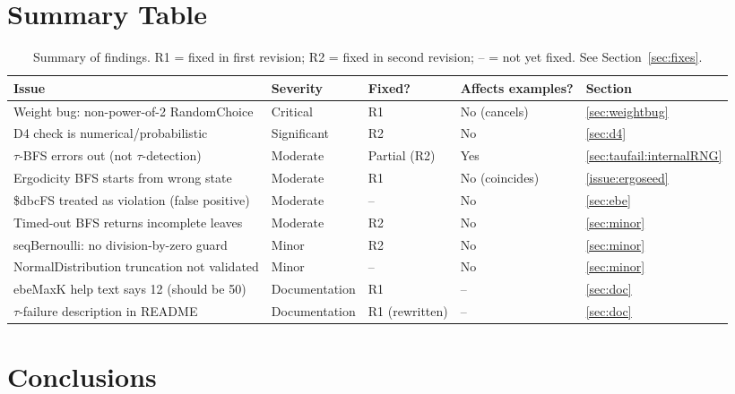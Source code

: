 \documentclass[12pt,a4paper]{article}
\theoremstyle{critical}
\theoremstyle{remark}
\begin{document}
\section{Summary Table}
\label{sec:summary}

\begin{table}[h!]
\centering
\begin{tabular}{lllll}
\toprule
\textbf{Issue} & \textbf{Severity} & \textbf{Fixed?} & \textbf{Affects examples?} & \textbf{Section} \\
\midrule
Weight bug: non-power-of-2 RandomChoice & Critical & R1 & No (cancels) & \ref{sec:weightbug} \\
D4 check is numerical/probabilistic & Significant & R2 & No & \ref{sec:d4} \\
$\tau$-BFS errors out (not $\tau$-detection) & Moderate & Partial (R2) & Yes & \ref{sec:taufail:internalRNG} \\
Ergodicity BFS starts from wrong state & Moderate & R1 & No (coincides) & \ref{issue:ergoseed} \\
\$dbcFS treated as violation (false positive) & Moderate & -- & No & \ref{sec:ebe} \\
Timed-out BFS returns incomplete leaves & Moderate & R2 & No & \ref{sec:minor} \\
seqBernoulli: no division-by-zero guard & Minor & R2 & No & \ref{sec:minor} \\
NormalDistribution truncation not validated & Minor & -- & No & \ref{sec:minor} \\
ebeMaxK help text says 12 (should be 50) & Documentation & R1 & -- & \ref{sec:doc} \\
$\tau$-failure description in README & Documentation & R1 (rewritten) & -- & \ref{sec:doc} \\
\bottomrule
\end{tabular}
\caption{Summary of findings. R1 = fixed in first revision; R2 = fixed in second revision;
  -- = not yet fixed. See Section~\ref{sec:fixes}.}
\end{table}

\section{Conclusions}
\end{document}
